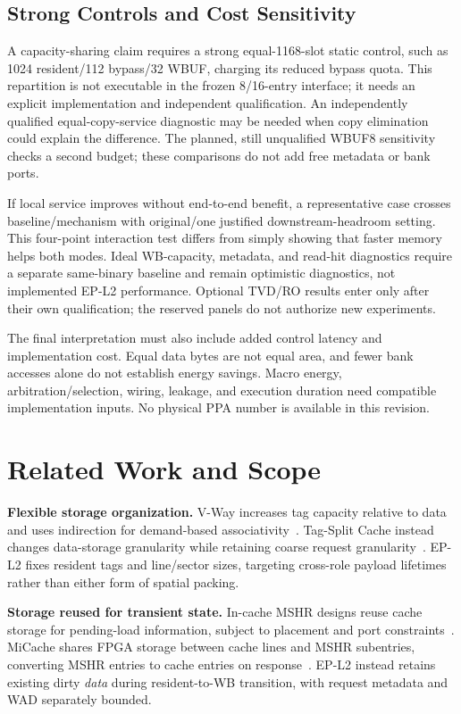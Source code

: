 \documentclass[conference,letterpaper]{IEEEtran}
\newcommand{\epl}{EP-L2}
\begin{document}
\subsection{Strong Controls and Cost Sensitivity}
A capacity-sharing claim requires a strong equal-1168-slot static control, such as 1024 resident/112 bypass/32 WBUF, charging its reduced bypass quota. This repartition is not executable in the frozen 8/16-entry interface; it needs an explicit implementation and independent qualification. An independently qualified equal-copy-service diagnostic may be needed when copy elimination could explain the difference. The planned, still unqualified WBUF8 sensitivity checks a second budget; these comparisons do not add free metadata or bank ports.

If local service improves without end-to-end benefit, a representative case crosses baseline/mechanism with original/one justified downstream-headroom setting. This four-point interaction test differs from simply showing that faster memory helps both modes. Ideal WB-capacity, metadata, and read-hit diagnostics require a separate same-binary baseline and remain optimistic diagnostics, not implemented \epl{} performance. Optional TVD/RO results enter only after their own qualification; the reserved panels do not authorize new experiments.

The final interpretation must also include added control latency and implementation cost. Equal data bytes are not equal area, and fewer bank accesses alone do not establish energy savings. Macro energy, arbitration/selection, wiring, leakage, and execution duration need compatible implementation inputs. No physical PPA number is available in this revision.

\section{Related Work and Scope}
\textbf{Flexible storage organization.} V-Way increases tag capacity relative to data and uses indirection for demand-based associativity~\cite{vway}. Tag-Split Cache instead changes data-storage granularity while retaining coarse request granularity~\cite{tsc}. \epl{} fixes resident tags and line/sector sizes, targeting cross-role payload lifetimes rather than either form of spatial packing.

\textbf{Storage reused for transient state.} In-cache MSHR designs reuse cache storage for pending-load information, subject to placement and port constraints~\cite{farkas}. MiCache shares FPGA storage between cache lines and MSHR subentries, converting MSHR entries to cache entries on response~\cite{micache}. \epl{} instead retains existing dirty \emph{data} during resident-to-WB transition, with request metadata and WAD separately bounded.
\end{document}
